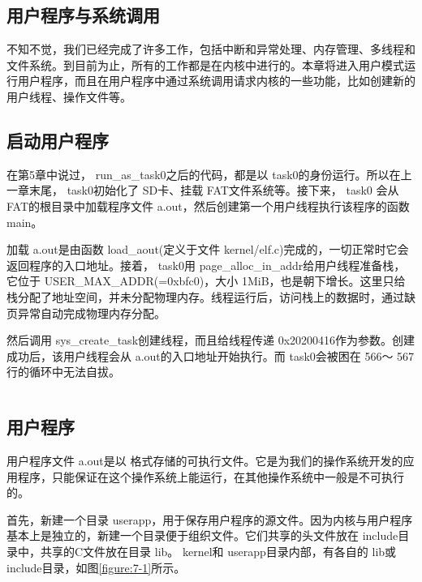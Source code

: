 \documentclass[main.tex]{subfiles}
\begin{document}
\ifxetex\else\begin{CJK*}{UTF8}{song}\fi

\chapter{用户程序与系统调用}
不知不觉，我们已经完成了许多工作，包括中断和异常处理、内存管理、多线程和文件系统。到目前为止，所有的工作都是在内核中进行的。本章将进入用户模式运行用户程序，而且在用户程序中通过系统调用请求内核的一些功能，比如创建新的用户线程、操作文件等。

\section{启动用户程序}
在第5章中说过， run\_\-as\_\-task0之后的代码，都是以 task0的身份运行。所以在上一章末尾， task0初始化了 SD卡、挂载 FAT文件系统等。接下来， task0
会从 FAT的根目录中加载程序文件 a.out，然后创建第一个用户线程执行该程序的函数 main。

\par
加载 a.out是由函数 load\_\-aout(定义于文件 kernel/elf.c)完成的，一切正常时它会返回程序的入口地址。接着， task0用 page\_\-alloc\_\-in\_\-addr给用户线程准备栈，它位于 USER\_\-MAX\_\-ADDR(=0xbfc0)，大小 1MiB，也是朝下增长。这里只给栈分配了地址空间，并未分配物理内存。线程运行后，访问栈上的数据时，通过缺页异常自动完成物理内存分配。

\par
然后调用 sys\_\-create\_\-task创建线程，而且给线程传递 0x2020\-0416作为参数。创建成功后，该用户线程会从 a.out的入口地址开始执行。而 task0会被困在 566～ 567行的循环中无法自拔。

\begin{code}
\label{code:7-1}
\inputminted[firstline=538,lastline=570,linenos,numbersep=5pt,frame=lines,framesep=2mm]{c}{src/chapter07/kernel/machdep.c}
\end{code}

\section{用户程序}
用户程序文件 a.out是以 格式存储的可执行文件。它是为我们的操作系统开发的应用程序，只能保证在这个操作系统上能运行，在其他操作系统中一般是不可执行的。

\par
首先，新建一个目录 userapp，用于保存用户程序的源文件。因为内核与用户程序基本上是独立的，新建一个目录便于组织文件。它们共享的头文件放在 include目录中，共享的C文件放在目录 lib。 kernel和 userapp目录内部，有各自的 lib或 include目录，如图\ref{figure:7-1}所示。


\end{CJK*}
\end{document}
